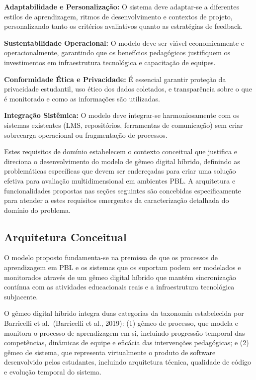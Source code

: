 \documentclass[english, spanish, brazilian]{modelo_dt}
\begin{document}
\textbf{Adaptabilidade e Personalização:} O sistema deve adaptar-se a diferentes estilos de aprendizagem, ritmos de desenvolvimento e contextos de projeto, personalizando tanto os critérios avaliativos quanto as estratégias de feedback.

\textbf{Sustentabilidade Operacional:} O modelo deve ser viável economicamente e operacionalmente, garantindo que os benefícios pedagógicos justifiquem os investimentos em infraestrutura tecnológica e capacitação de equipes.

\textbf{Conformidade Ética e Privacidade:} É essencial garantir proteção da privacidade estudantil, uso ético dos dados coletados, e transparência sobre o que é monitorado e como as informações são utilizadas.

\textbf{Integração Sistêmica:} O modelo deve integrar-se harmoniosamente com os sistemas existentes (LMS, repositórios, ferramentas de comunicação) sem criar sobrecarga operacional ou fragmentação de processos.

Estes requisitos de domínio estabelecem o contexto conceitual que justifica e
direciona o desenvolvimento do modelo de gêmeo digital híbrido, definindo as
problemáticas específicas que devem ser endereçadas para criar uma solução
efetiva para avaliação multidimensional em ambientes PBL. A arquitetura e
funcionalidades propostas nas seções seguintes são concebidas especificamente
para atender a estes requisitos emergentes da caracterização detalhada do
domínio do problema.

\subsection{Arquitetura Conceitual}

O modelo proposto fundamenta-se na premissa de que os processos de aprendizagem
em PBL e os sistemas que os suportam podem ser modelados e monitorados através
de um gêmeo digital híbrido que mantém sincronização contínua com as atividades
educacionais reais e a infraestrutura tecnológica subjacente\@.

O gêmeo digital híbrido integra duas categorias da taxonomia estabelecida por
Barricelli et al.\@~(Barricelli et al., 2019): (1) gêmeo de processo, que
modela e monitora o processo de aprendizagem em si, incluindo progressão
temporal das competências, dinâmicas de equipe e eficácia das intervenções
pedagógicas; e (2) gêmeo de sistema, que representa virtualmente o produto de
software desenvolvido pelos estudantes, incluindo arquitetura técnica,
qualidade de código e evolução temporal do sistema\@.
\end{document}
